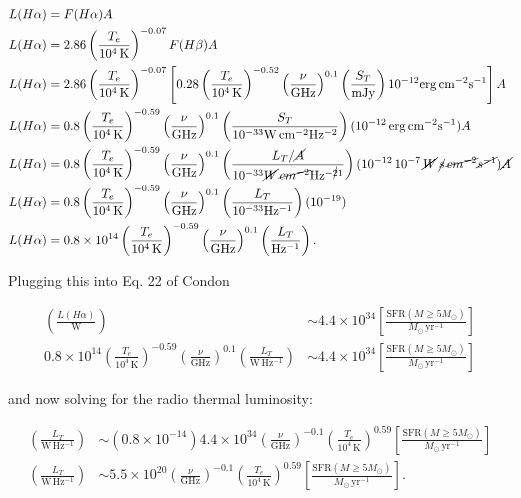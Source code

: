 \documentclass[12pt]{article}
\begin{document}
\begin{align*}
    L(H\alpha) &= F(H\alpha) A \\
    L(H\alpha) &= 2.86 \left(\frac{T_e}{10^4\,\mathrm{K}}\right)^{-0.07} F(H\beta) A \\
    L(H\alpha) &= 2.86 \left(\frac{T_e}{10^4\,\mathrm{K}}\right)^{-0.07} \left[ 0.28 \left(\frac{T_e}{10^4\,\mathrm{K}}\right)^{-0.52} \left(\frac{\nu}{\mathrm{GHz}}\right)^{0.1} \left(\frac{S_T}{\mathrm{mJy}}\right) 10^{-12}\mathrm{erg\,cm^{-2}s^{-1}} \right] A \\
    L(H\alpha) &= 0.8 \left(\frac{T_e}{10^4\,\mathrm{K}}\right)^{-0.59} \left(\frac{\nu}{\mathrm{GHz}}\right)^{0.1} \left(\frac{S_T}{10^{-33}\mathrm{W\,cm^{-2}Hz^{-2}}}\right) (10^{-12}\,\mathrm{erg\,cm^{-2}s^{-1}}) A \\
    L(H\alpha) &= 0.8 \left(\frac{T_e}{10^4\,\mathrm{K}}\right)^{-0.59} \left(\frac{\nu}{\mathrm{GHz}}\right)^{0.1} \left(\frac{L_T/\cancel{A}}{10^{-33}\mathrm{\cancel{W}\,\cancel{cm^{-2}}Hz^{-\cancel{2}1}}}\right) (10^{-12}\,\mathrm{10^{-7}\,\cancel{W}\,\cancel{s}\,\cancel{cm^{-2}}\cancel{s^{-1}}}) \cancel{A} \\
    L(H\alpha) &= 0.8 \left(\frac{T_e}{10^4\,\mathrm{K}}\right)^{-0.59} \left(\frac{\nu}{\mathrm{GHz}}\right)^{0.1} \left(\frac{L_T}{10^{-33}\mathrm{Hz^{-1}}}\right) (10^{-19}) \\
    L(H\alpha) &= 0.8\times10^{14} \left(\frac{T_e}{10^4\,\mathrm{K}}\right)^{-0.59} \left(\frac{\nu}{\mathrm{GHz}}\right)^{0.1} \left(\frac{L_T}{\mathrm{Hz^{-1}}}\right).
\end{align*}

{\noindent}Plugging this into Eq. 22 of Condon

\begin{align*}
    \left(\frac{L(H\alpha)}{\mathrm{W}}\right) &\sim 4.4\times10^{34} \left[\frac{\mathrm{SFR}(M \geq 5M_\odot)}{M_\odot\,\mathrm{yr^{-1}}}\right] \\
    0.8\times10^{14} \left(\frac{T_e}{10^4\,\mathrm{K}}\right)^{-0.59} \left(\frac{\nu}{\mathrm{GHz}}\right)^{0.1} \left(\frac{L_T}{\mathrm{W\,Hz^{-1}}}\right) &\sim 4.4\times10^{34} \left[\frac{\mathrm{SFR}(M \geq 5M_\odot)}{M_\odot\,\mathrm{yr^{-1}}}\right] 
\end{align*}

{\noindent}and now solving for the radio thermal luminosity:

\begin{align*}
    \left(\frac{L_T}{\mathrm{W\,Hz^{-1}}}\right) &\sim (0.8\times10^{-14}) 4.4\times10^{34} \left(\frac{\nu}{\mathrm{GHz}}\right)^{-0.1} \left(\frac{T_e}{10^4\,\mathrm{K}}\right)^{0.59} \left[\frac{\mathrm{SFR}(M \geq 5M_\odot)}{M_\odot\,\mathrm{yr^{-1}}}\right] \\
    \left(\frac{L_T}{\mathrm{W\,Hz^{-1}}}\right) &\sim 5.5\times10^{20} \left(\frac{\nu}{\mathrm{GHz}}\right)^{-0.1} \left(\frac{T_e}{10^4\,\mathrm{K}}\right)^{0.59} \left[\frac{\mathrm{SFR}(M \geq 5M_\odot)}{M_\odot\,\mathrm{yr^{-1}}}\right].
\end{align*}
\end{document}
